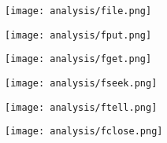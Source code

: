 \begin{multicols}{2}
\begin{center}
\texttt{[image: analysis/file.png]} 
\end{center}
\columnbreak
\begin{center}
\texttt{[image: analysis/fput.png]} 
\end{center}
\end{multicols}

\begin{multicols}{2}
\begin{center}
\texttt{[image: analysis/fget.png]} 
\end{center}
\columnbreak
\begin{center}
\texttt{[image: analysis/fseek.png]} 
\end{center}
\end{multicols}

\begin{multicols}{2}
\begin{center}
\texttt{[image: analysis/ftell.png]} 
\end{center}
\columnbreak
\begin{center}
\texttt{[image: analysis/fclose.png]} 
\end{center}
\end{multicols}

